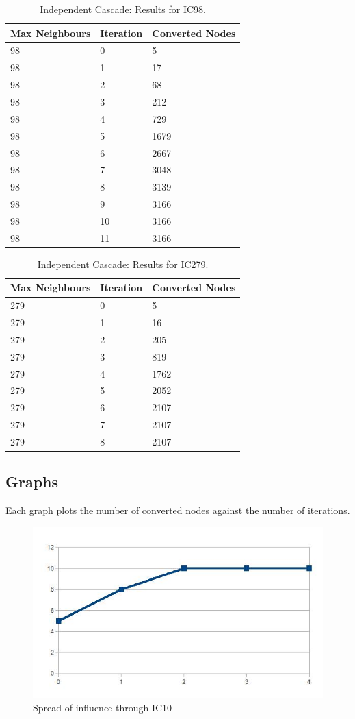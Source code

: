 \begin{table}
\centering
\begin{tabular}{|l||l|l|}
\hline
Max Neighbours & Iteration & Converted Nodes \\
\hline
98 & 0 & 5 \\
98 & 1 & 17 \\
98 & 2 & 68 \\
98 & 3 & 212 \\
98 & 4 & 729 \\
98 & 5 & 1679 \\
98 & 6 & 2667 \\
98 & 7 & 3048 \\
98 & 8 & 3139 \\
98 & 9 & 3166 \\
98 & 10 & 3166 \\
98 & 11 & 3166 \\
\hline
\end{tabular}
\caption{Independent Cascade: Results for IC98.}
\label{tab:ic_results98}
\end{table}


\begin{table}
\centering
\begin{tabular}{|l||l|l|}
\hline
Max Neighbours & Iteration & Converted Nodes \\
\hline
279 & 0 & 5 \\
279 & 1 & 16 \\
279 & 2 & 205 \\
279 & 3 & 819 \\
279 & 4 & 1762 \\
279 & 5 & 2052 \\
279 & 6 & 2107 \\
279 & 7 & 2107 \\
279 & 8 & 2107 \\
\hline
\end{tabular}
\caption{Independent Cascade: Results for IC279.}
\label{tab:ic_results279}
\end{table}

\subsection{Graphs}

Each graph plots the number of converted nodes against the number of iterations. 

\begin{figure}[htbp]%
\centering
\includegraphics[width=0.5\columnwidth]{./img/ic10}%
\caption{Spread of influence through IC10}%
\label{fig:ic10}%
\end{figure}

